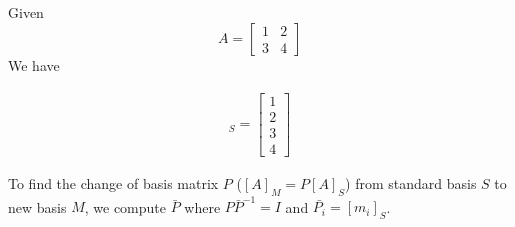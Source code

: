 \documentclass{article}
\theoremstyle{definition} %
\begin{document}
\subsection{}
Given
$$
A = 
\begin{bmatrix}
    1 & 2 \\ 3 & 4
\end{bmatrix}
$$
We have

\begin{align*}
    [A]_S = 
    \begin{bmatrix}
        1 \\ 2 \\ 3 \\ 4
    \end{bmatrix}
\end{align*}

To find the change of basis matrix $P$ ($[A]_M = P[A]_S$) from standard basis $S$ to new basis $M$, we compute $\bar P$ where $P\bar{P}^{-1} = I$ and $\bar{P_i} = [m_i]_S$.
\end{document}
